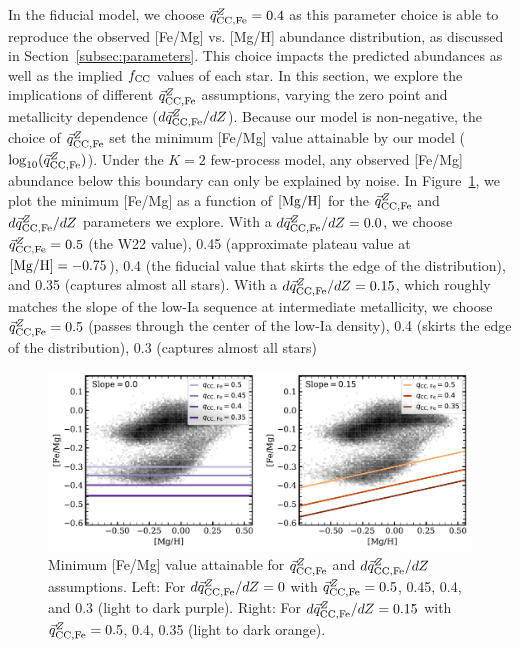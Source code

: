 \documentclass[modern]{aastex631}
\newcommand{\mgh}{[{\rm Mg}/{\rm H}]}
\newcommand{\qccFe}{\vec{q}_{{\rm CC, Fe}}^{Z}}
\newcommand{\dqccFe}{d\vec{q}_{{\rm CC, Fe}}^{Z}/dZ}
\newcommand{\fcc}{f_{\rm CC}}
\begin{document}
In the fiducial model, we choose $\qccFe = 0.4$ as this parameter choice is able to reproduce the observed [Fe/Mg] vs. [Mg/H] abundance distribution, as discussed in Section~\ref{subsec:parameters}. This choice impacts the predicted abundances as well as the implied $\fcc$ values of each star. In this section, we explore the implications of different $\qccFe$ assumptions, varying the zero point and metallicity dependence ($\dqccFe$). Because our model is non-negative, the choice of $\qccFe$ set the minimum [Fe/Mg] value attainable by our model ($\log_{10}(\qccFe)$). Under the $K=2$ few-process model, any observed [Fe/Mg] abundance below this boundary can only be explained by noise. In Figure~\ref{fig:qccFe_FeMg}, we plot the minimum [Fe/Mg] as a function of $\mgh$ for the $\qccFe$ and $\dqccFe$ parameters we explore. With a $\dqccFe=0.0$, we choose $\qccFe=0.5$ (the W22 value), 0.45 (approximate plateau value at $\mgh=-0.75$), 0.4 (the fiducial value that skirts the edge of the distribution), and 0.35 (captures almost all stars). With a $\dqccFe=0.15$, which roughly matches the slope of the low-Ia sequence at intermediate metallicity, we choose $\qccFe=0.5$ (passes through the center of the low-Ia density), 0.4 (skirts the edge of the distribution), 0.3 (captures almost all stars)

\begin{figure}[htb!]
    \centering
    \includegraphics[width=\textwidth]{Paper/Figures/qccFe_FeMg.pdf}
    \caption{Minimum [Fe/Mg] value attainable for $\qccFe$ and $\dqccFe$ assumptions. Left: For $\dqccFe=0$ with $\qccFe=0.5$, 0.45, 0.4, and 0.3 (light to dark purple). Right: For $\dqccFe=0.15$ with $\qccFe=0.5$, 0.4, 0.35 (light to dark orange).}
    \label{fig:qccFe_FeMg}
\end{figure}
\end{document}
